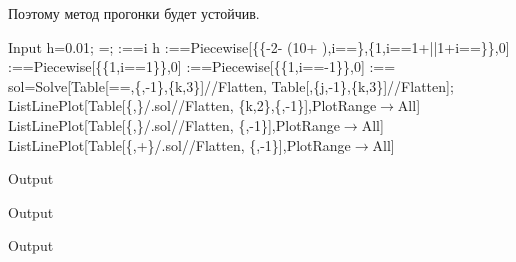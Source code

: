 \documentclass[a4paper]{article}
\begin{document}
\begin{sol}
Поэтому метод прогонки будет устойчив.
\begin{mmaCell}[addtoindex=-1,moredefined={h, sol},morepattern={i_, i, j_},morefunctionlocal={j, k}]{Input}
  h=0.01;
  =;
  :==i h
  :==Piecewise[\{\{-2- (10+ ),i==\},\{1,i==1+||1+i==\}\},0]
  :==Piecewise[\{\{1,i==1\}\},0]
  :==Piecewise[\{\{1,i==-1\}\},0]
  :==
  sol=Solve[Table[==,\{,-1\},\{k,3\}]//Flatten,
  Table[,\{j,-1\},\{k,3\}]//Flatten];
  ListLinePlot[Table[\{,\}/.sol//Flatten,
  \{k,2\},\{,-1\}],PlotRange\(\pmb{\to}\)All]
  ListLinePlot[Table[\{,\}/.sol//Flatten,
  \{,-1\}],PlotRange\(\pmb{\to}\)All]
  ListLinePlot[Table[\{,+\}/.sol//Flatten,
  \{,-1\}],PlotRange\(\pmb{\to}\)All]
\end{mmaCell}
 \begin{mmaCell}[moregraphics={moreig={scale=.7}}]{Output}
 \end{mmaCell}
 \begin{mmaCell}[moregraphics={moreig={scale=.7}}]{Output}
 \end{mmaCell}
 \begin{mmaCell}[moregraphics={moreig={scale=.7}}]{Output}
 \end{mmaCell}
\end{sol}
\begin{hiProb}[9.3б]
		
\end{hiProb}
\end{document}
